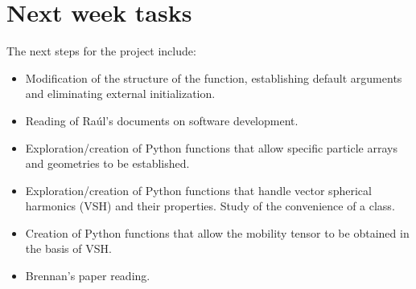 \documentclass[12pt]{article} %
\begin{document}
\section{Next week tasks}
The next steps for the project include:
\begin{itemize} 
    \item Modification of the structure of the  function, establishing default arguments and eliminating external initialization.
    \item Reading of Raúl's documents on software development.
    \item Exploration/creation of Python functions that allow specific particle arrays and geometries to be established.
    \item Exploration/creation of Python functions that handle vector spherical harmonics (VSH) and their properties. Study of the convenience of a class.
    \item Creation of Python functions that allow the mobility tensor to be obtained in the basis of VSH.
    \item Brennan's paper reading.
\end{itemize}
\end{document}
